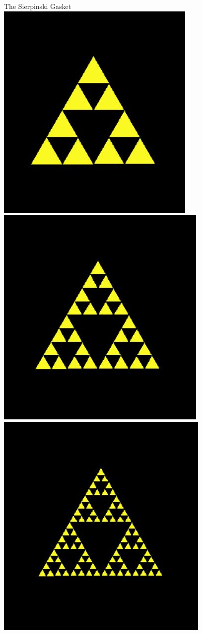 \documentclass{beamer}
\begin{document}
\begin{frame}{The Sierpinski Gasket}
\includegraphics[scale=.25]{gasket2.JPG} \hspace{1em}
\includegraphics[scale=.25]{gasket3.JPG} \hspace{1em}
\includegraphics[scale=.25]{gasket4.JPG} 
\end{frame}
\end{document}
